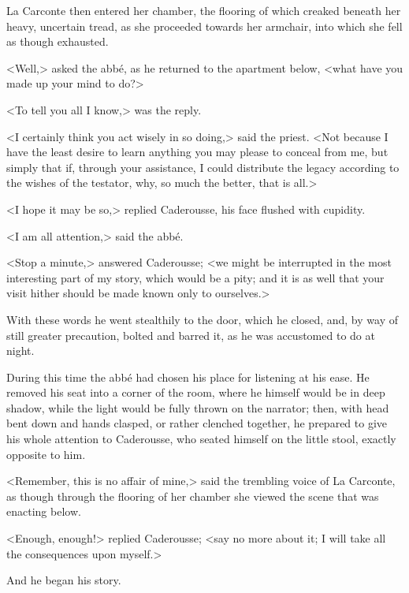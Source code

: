  La Carconte then entered her chamber, the flooring of which creaked beneath her heavy, uncertain tread, as she proceeded towards her armchair, into which she fell as though exhausted. 

 <Well,> asked the abbé, as he returned to the apartment below, <what have you made up your mind to do?> 

 <To tell you all I know,> was the reply. 

 <I certainly think you act wisely in so doing,> said the priest. <Not because I have the least desire to learn anything you may please to conceal from me, but simply that if, through your assistance, I could distribute the legacy according to the wishes of the testator, why, so much the better, that is all.> 

 <I hope it may be so,> replied Caderousse, his face flushed with cupidity. 

 <I am all attention,> said the abbé. 

 <Stop a minute,> answered Caderousse; <we might be interrupted in the most interesting part of my story, which would be a pity; and it is as well that your visit hither should be made known only to ourselves.> 

 With these words he went stealthily to the door, which he closed, and, by way of still greater precaution, bolted and barred it, as he was accustomed to do at night. 

 During this time the abbé had chosen his place for listening at his ease. He removed his seat into a corner of the room, where he himself would be in deep shadow, while the light would be fully thrown on the narrator; then, with head bent down and hands clasped, or rather clenched together, he prepared to give his whole attention to Caderousse, who seated himself on the little stool, exactly opposite to him. 

 <Remember, this is no affair of mine,> said the trembling voice of La Carconte, as though through the flooring of her chamber she viewed the scene that was enacting below. 

 <Enough, enough!> replied Caderousse; <say no more about it; I will take all the consequences upon myself.> 

 And he began his story. 